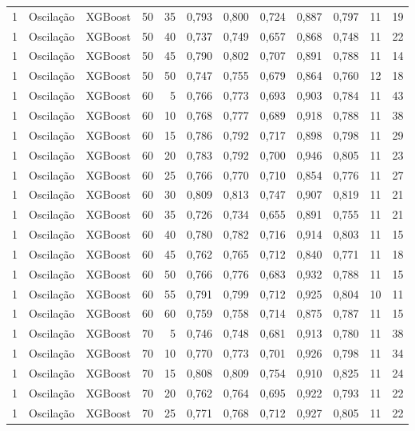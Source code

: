 \begin{longtable}{@{}rllrrrrrrrrr@{}}
1 & Oscilação & XGBoost & 50 & 35 & 0,793 & 0,800 & 0,724 & 0,887 & 0,797 & 11 & 19 \\
1 & Oscilação & XGBoost & 50 & 40 & 0,737 & 0,749 & 0,657 & 0,868 & 0,748 & 11 & 22 \\
1 & Oscilação & XGBoost & 50 & 45 & 0,790 & 0,802 & 0,707 & 0,891 & 0,788 & 11 & 14 \\
1 & Oscilação & XGBoost & 50 & 50 & 0,747 & 0,755 & 0,679 & 0,864 & 0,760 & 12 & 18 \\
1 & Oscilação & XGBoost & 60 & 5 & 0,766 & 0,773 & 0,693 & 0,903 & 0,784 & 11 & 43 \\
1 & Oscilação & XGBoost & 60 & 10 & 0,768 & 0,777 & 0,689 & 0,918 & 0,788 & 11 & 38 \\
1 & Oscilação & XGBoost & 60 & 15 & 0,786 & 0,792 & 0,717 & 0,898 & 0,798 & 11 & 29 \\
1 & Oscilação & XGBoost & 60 & 20 & 0,783 & 0,792 & 0,700 & 0,946 & 0,805 & 11 & 23 \\
1 & Oscilação & XGBoost & 60 & 25 & 0,766 & 0,770 & 0,710 & 0,854 & 0,776 & 11 & 27 \\
1 & Oscilação & XGBoost & 60 & 30 & 0,809 & 0,813 & 0,747 & 0,907 & 0,819 & 11 & 21 \\
1 & Oscilação & XGBoost & 60 & 35 & 0,726 & 0,734 & 0,655 & 0,891 & 0,755 & 11 & 21 \\
1 & Oscilação & XGBoost & 60 & 40 & 0,780 & 0,782 & 0,716 & 0,914 & 0,803 & 11 & 15 \\
1 & Oscilação & XGBoost & 60 & 45 & 0,762 & 0,765 & 0,712 & 0,840 & 0,771 & 11 & 18 \\
1 & Oscilação & XGBoost & 60 & 50 & 0,766 & 0,776 & 0,683 & 0,932 & 0,788 & 11 & 15 \\
1 & Oscilação & XGBoost & 60 & 55 & 0,791 & 0,799 & 0,712 & 0,925 & 0,804 & 10 & 11 \\
1 & Oscilação & XGBoost & 60 & 60 & 0,759 & 0,758 & 0,714 & 0,875 & 0,787 & 11 & 15 \\
1 & Oscilação & XGBoost & 70 & 5 & 0,746 & 0,748 & 0,681 & 0,913 & 0,780 & 11 & 38 \\
1 & Oscilação & XGBoost & 70 & 10 & 0,770 & 0,773 & 0,701 & 0,926 & 0,798 & 11 & 34 \\
1 & Oscilação & XGBoost & 70 & 15 & 0,808 & 0,809 & 0,754 & 0,910 & 0,825 & 11 & 24 \\
1 & Oscilação & XGBoost & 70 & 20 & 0,762 & 0,764 & 0,695 & 0,922 & 0,793 & 11 & 22 \\
1 & Oscilação & XGBoost & 70 & 25 & 0,771 & 0,768 & 0,712 & 0,927 & 0,805 & 11 & 22 \\

\end{longtable}
